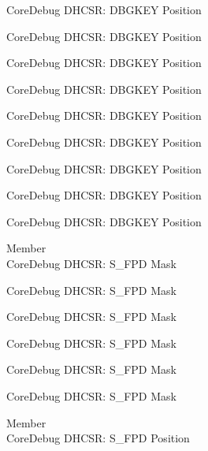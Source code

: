 \begin{DoxyRefList}
\label{deprecated__deprecated000558}%
%
Core\+Debug DHCSR\+: DBGKEY Position 

\label{deprecated__deprecated000664}%
%
Core\+Debug DHCSR\+: DBGKEY Position 

\label{deprecated__deprecated000764}%
%
Core\+Debug DHCSR\+: DBGKEY Position 

\label{deprecated__deprecated000818}%
%
Core\+Debug DHCSR\+: DBGKEY Position 

\label{deprecated__deprecated000903}%
%
Core\+Debug DHCSR\+: DBGKEY Position 

\label{deprecated__deprecated000960}%
%
Core\+Debug DHCSR\+: DBGKEY Position 

\label{deprecated__deprecated001036}%
%
Core\+Debug DHCSR\+: DBGKEY Position 

\label{deprecated__deprecated001115}%
%
Core\+Debug DHCSR\+: DBGKEY Position 

\label{deprecated__deprecated001217}%
%
Core\+Debug DHCSR\+: DBGKEY Position  
\item[Member \doxylink{group___c_m_s_i_s___s_c_b_gae37ad624177fe2d3298fd32d528805aa}{Core\+Debug\+\_\+\+DHCSR\+\_\+\+S\+\_\+\+FPD\+\_\+\+Msk} ]\hfill \\
\label{deprecated__deprecated000014}%
%
Core\+Debug DHCSR\+: S\+\_\+\+FPD Mask 

\label{deprecated__deprecated000465}%
%
Core\+Debug DHCSR\+: S\+\_\+\+FPD Mask 

\label{deprecated__deprecated000567}%
%
Core\+Debug DHCSR\+: S\+\_\+\+FPD Mask 

\label{deprecated__deprecated000673}%
%
Core\+Debug DHCSR\+: S\+\_\+\+FPD Mask 

\label{deprecated__deprecated001124}%
%
Core\+Debug DHCSR\+: S\+\_\+\+FPD Mask 

\label{deprecated__deprecated001226}%
%
Core\+Debug DHCSR\+: S\+\_\+\+FPD Mask  
\item[Member \doxylink{group___c_m_s_i_s___s_c_b_ga620b141720c475f5bde4138855c6ed83}{Core\+Debug\+\_\+\+DHCSR\+\_\+\+S\+\_\+\+FPD\+\_\+\+Pos} ]\hfill \\
\label{deprecated__deprecated000013}%
%
Core\+Debug DHCSR\+: S\+\_\+\+FPD Position 


\end{DoxyRefList}
